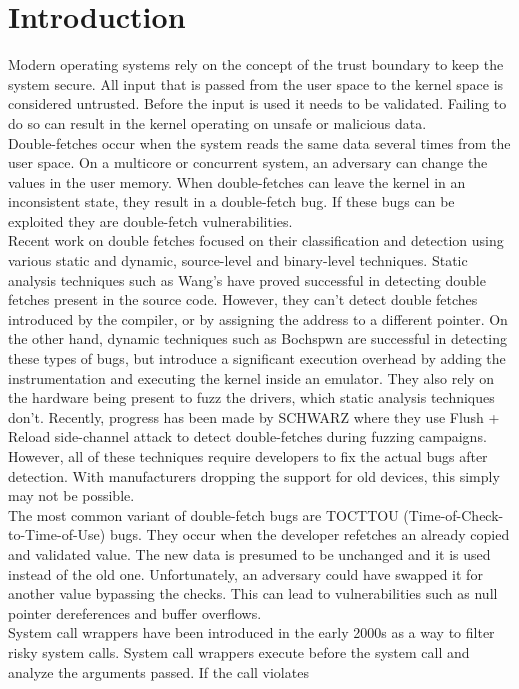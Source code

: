 \documentclass[conference]{IEEEtran}
\begin{document}
\section{Introduction}
Modern operating systems rely on the concept of the trust boundary to keep the system secure. All input that is passed from the user space to the kernel space is considered untrusted. 
Before the input is used it needs to be validated. Failing to do so can result in the kernel operating on unsafe or malicious data.
\\
Double-fetches occur when the system reads the same data several times from the user space. On a multicore or concurrent system, an adversary can change the values in the user memory.
When double-fetches can leave the kernel in an inconsistent state, they result in a double-fetch bug. If these bugs can be exploited they are double-fetch vulnerabilities.
\\
Recent work on double fetches focused on their classification and detection using various static and dynamic, source-level and binary-level techniques. Static analysis techniques such as Wang's have proved successful in detecting
double fetches present in the source code. However, they can't detect double fetches introduced by the compiler, or by assigning the address to a different pointer. On the other hand, dynamic techniques such as Bochspwn are successful
in detecting these types of bugs, but introduce a significant execution overhead by adding the instrumentation and executing the kernel inside an emulator. They also rely on the hardware being present to fuzz the drivers, which static
analysis techniques don't. Recently, progress has been made by SCHWARZ where they use Flush + Reload side-channel attack to detect double-fetches during fuzzing campaigns. However, all of these techniques require
developers to fix the actual bugs after detection. With manufacturers dropping the support for old devices, this simply may not be possible.
\\
The most common variant of double-fetch bugs are TOCTTOU (Time-of-Check-to-Time-of-Use) bugs. They occur when the developer refetches an already copied and validated value. The new data is presumed
to be unchanged and it is used instead of the old one. Unfortunately, an adversary could have swapped it for another value bypassing the checks. This can lead to vulnerabilities such as null pointer
dereferences and buffer overflows.
\\
System call wrappers have been introduced in the early 2000s as a way to filter risky system calls. System call wrappers execute before the system call and analyze the arguments passed. If the call violates
\end{document}
